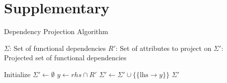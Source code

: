 \documentclass[UTF8]{beamer}
\begin{document}
\section{Supplementary}

\begin{frame}{Dependency Projection Algorithm}
\begin{algorithm}[H]
\small
\caption{Dependency Projection Algorithm\footnote{\href{https://github.com/pratik2358/fucntional_dep/blob/main/functional_deps.ipynb}
{\textcolor{blue}{Link to code$\to$ Cell 1:} \textcolor{red}{project\_dependency}}}}
\label{algorithm:algo}
\begin{algorithmic}[1]
\REQUIRE $\Sigma$: Set of functional dependencies
\REQUIRE $R'$: Set of attributes to project on
\ENSURE $\Sigma'$: Projected set of functional dependencies

\STATE Initialize $\Sigma' \gets \emptyset$
        \STATE $y \gets rhs \cap R'$
            \STATE $\Sigma' \gets \Sigma' \cup \{\{\text{lhs} \to y\}\}$
        \ENDIF
    \ENDIF
\ENDFOR
\RETURN $\Sigma'$
\end{algorithmic}
\end{algorithm}
\end{frame}
\end{document}
